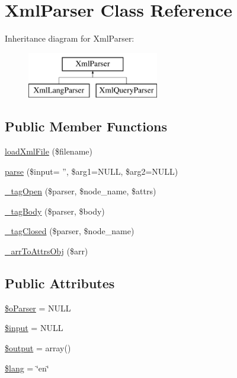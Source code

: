 \hypertarget{classXmlParser}{\section{Xml\-Parser Class Reference}
\label{classXmlParser}
}
Inheritance diagram for Xml\-Parser\-:\begin{figure}[H]
\begin{center}
\leavevmode
\includegraphics[height=2.000000cm]{classXmlParser}
\end{center}
\end{figure}
\subsection*{Public Member Functions}
\begin{DoxyCompactItemize}
\item 
\hyperlink{classXmlParser_a3975b17b893e196069963d433046771b}{load\-Xml\-File} (\$filename)
\item 
\hyperlink{classXmlParser_aa7b52a3ab42568f6f49056d928688e7a}{parse} (\$input= '', \$arg1=N\-U\-L\-L, \$arg2=N\-U\-L\-L)
\item 
\hyperlink{classXmlParser_a01facf5db302e49b0b61fb0e1b1fee36}{\-\_\-tag\-Open} (\$parser, \$node\-\_\-name, \$attrs)
\item 
\hyperlink{classXmlParser_a1205550b688631ab1296365904c61a92}{\-\_\-tag\-Body} (\$parser, \$body)
\item 
\hyperlink{classXmlParser_acb524a3ecf27535c9b085a93d714e1c5}{\-\_\-tag\-Closed} (\$parser, \$node\-\_\-name)
\item 
\hyperlink{classXmlParser_ad6c6c76f2e0c9fbd04c071fc30f1a193}{\-\_\-arr\-To\-Attrs\-Obj} (\$arr)
\end{DoxyCompactItemize}
\subsection*{Public Attributes}
\begin{DoxyCompactItemize}
\item 
\hyperlink{classXmlParser_aeee1082b5150f2adb53b16b42ca1b9f5}{\$o\-Parser} = N\-U\-L\-L
\item 
\hyperlink{classXmlParser_a65903457181cddd5d100685e0d6ba66a}{\$input} = N\-U\-L\-L
\item 
\hyperlink{classXmlParser_aa4324be74ded61847ce33730c7785389}{\$output} = array()
\item 
\hyperlink{classXmlParser_adbe603248522105c2912dcddeedcd6ab}{\$lang} = \char`\"{}en\char`\"{}
\end{DoxyCompactItemize}


